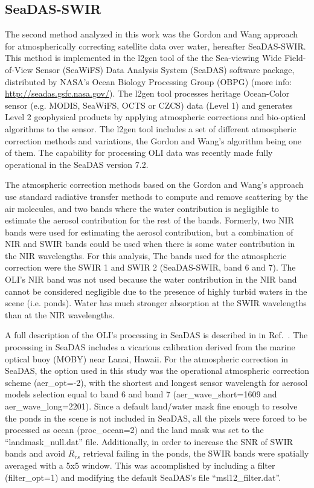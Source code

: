 \documentclass[draft]{spie}  %
\begin{document}
\subsection{SeaDAS-SWIR}
\label{subsec:seadasswir}
The second method analyzed in this work was the Gordon and Wang\cite{Gordon:1994} approach for atmospherically correcting satellite data over water, hereafter SeaDAS-SWIR. This method is implemented in the l2gen tool of the the Sea-viewing Wide Field-of-View Sensor (SeaWiFS) Data Analysis System (SeaDAS) software package, distributed by NASA's Ocean Biology Processing Group (OBPG) (more info: \url{http://seadas.gsfc.nasa.gov/}). The l2gen tool processes heritage Ocean-Color sensor (e.g. MODIS, SeaWiFS, OCTS or CZCS) data (Level 1) and generates Level 2 geophysical products by applying atmospheric corrections and bio-optical algorithms to the sensor. The l2gen tool includes a set of different atmospheric correction methods and variations, the Gordon and Wang's algorithm being one of them. The capability for processing OLI data was recently made fully operational in the SeaDAS version 7.2\cite{Franz:2015}. 

The atmospheric correction methods based on the Gordon and Wang's approach use standard radiative transfer methods to compute and remove scattering by the air molecules, and two bands where the water contribution is negligible to estimate the aerosol contribution for the rest of the bands. Formerly, two NIR bands were used for estimating the aerosol contribution, but a combination of NIR and SWIR bands could be used when there is some water contribution in the NIR wavelengths\cite{Wang2009}. For this analysis, The bands used for the atmospheric correction were the SWIR 1 and SWIR 2 (SeaDAS-SWIR, band 6 and 7). The OLI's NIR band was not used because the water contribution in the NIR band cannot be considered negligible due to the presence of highly turbid waters in the scene (i.e. ponds). Water has much stronger absorption at the SWIR wavelengths than at the NIR wavelengths. 

A full description of the OLI's processing in SeaDAS is described in in Ref.~. The processing in SeaDAS includes a vicarious calibration derived from the marine optical buoy (MOBY) near Lanai, Hawaii. For the atmospheric correction in SeaDAS, the option used in this study was the operational atmospheric correction scheme (aer\_opt=-2), with the shortest and longest sensor wavelength for aerosol models selection equal to band 6 and band 7 (aer\_wave\_short=1609 and aer\_wave\_long=2201). Since a default land/water mask fine enough to resolve the ponds in the scene is not included in SeaDAS, all the pixels were forced to be processed as ocean (proc\_ocean=2) and the land mask was set to the ``landmask\_null.dat'' file. Additionally, in order to increase the SNR of SWIR bands and avoid $R_{rs}$ retrieval failing in the ponds, the SWIR bands were spatially averaged with a 5x5 window. This was accomplished by including a filter (filter\_opt=1) and modifying the default SeaDAS's file ``msl12\_filter.dat''.
\end{document}
